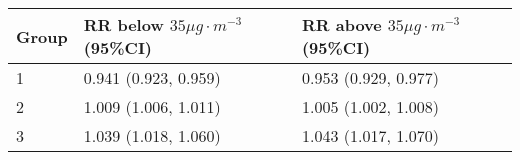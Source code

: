 \begin{tabular}{lll}
  \hline
Group & RR below $35 \mu g \cdot m^{-3}$ (95\%CI) & RR above $35 \mu g \cdot m^{-3}$ (95\%CI) \\ 
  \hline
   1 & 0.941 (0.923, 0.959) & 0.953 (0.929, 0.977) \\ 
     2 & 1.009 (1.006, 1.011) & 1.005 (1.002, 1.008) \\ 
     3 & 1.039 (1.018, 1.060) & 1.043 (1.017, 1.070) \\ 
   \hline
\end{tabular}

